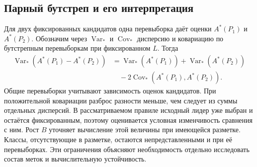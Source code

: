 \subsection{Парный бутстреп и его интерпретация}
Для двух фиксированных кандидатов одна перевыборка даёт оценки $A^*(P_1)$ и $A^*(P_2)$. Обозначим через $\operatorname{Var}_*$ и $\operatorname{Cov}_*$ дисперсию и ковариацию по бутстрепным перевыборкам при фиксированном $L$. Тогда
\begin{align}
 \operatorname{Var}_*\!\left(A^*(P_1)-A^*(P_2)\right)
 &=\operatorname{Var}_*\!\left(A^*(P_1)\right)+\operatorname{Var}_*\!\left(A^*(P_2)\right)\nonumber\\
 &\quad-2\operatorname{Cov}_*\!\left(A^*(P_1),A^*(P_2)\right).
\end{align}
Общие перевыборки учитывают зависимость оценок кандидатов. При положительной ковариации разброс разности меньше, чем следует из суммы отдельных дисперсий. В рассматриваемом правиле исходный лидер уже выбран и остаётся фиксированным, поэтому оценивается условная изменчивость сравнения с ним. Рост $B$ уточняет вычисление этой величины при имеющейся разметке. Классы, отсутствующие в разметке, остаются непредставленными и при её перевыборках. Эти ограничения объясняют необходимость отдельно исследовать состав меток и вычислительную устойчивость.
